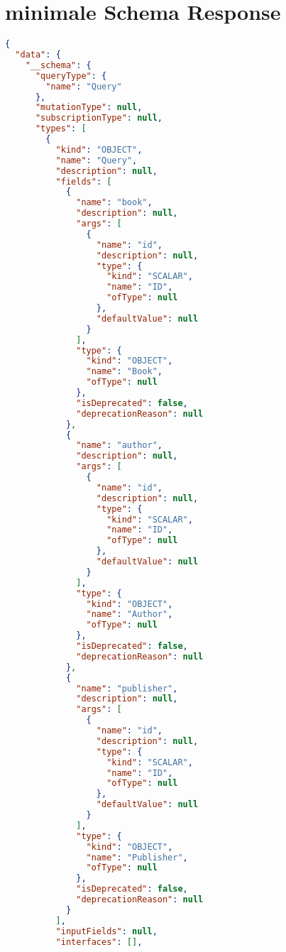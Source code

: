 \section*{minimale Schema Response}
\label{minimal-schema-response}
\begin{lstlisting}[language=json]
{
  "data": {
    "__schema": {
      "queryType": {
        "name": "Query"
      },
      "mutationType": null,
      "subscriptionType": null,
      "types": [
        {
          "kind": "OBJECT",
          "name": "Query",
          "description": null,
          "fields": [
            {
              "name": "book",
              "description": null,
              "args": [
                {
                  "name": "id",
                  "description": null,
                  "type": {
                    "kind": "SCALAR",
                    "name": "ID",
                    "ofType": null
                  },
                  "defaultValue": null
                }
              ],
              "type": {
                "kind": "OBJECT",
                "name": "Book",
                "ofType": null
              },
              "isDeprecated": false,
              "deprecationReason": null
            },
            {
              "name": "author",
              "description": null,
              "args": [
                {
                  "name": "id",
                  "description": null,
                  "type": {
                    "kind": "SCALAR",
                    "name": "ID",
                    "ofType": null
                  },
                  "defaultValue": null
                }
              ],
              "type": {
                "kind": "OBJECT",
                "name": "Author",
                "ofType": null
              },
              "isDeprecated": false,
              "deprecationReason": null
            },
            {
              "name": "publisher",
              "description": null,
              "args": [
                {
                  "name": "id",
                  "description": null,
                  "type": {
                    "kind": "SCALAR",
                    "name": "ID",
                    "ofType": null
                  },
                  "defaultValue": null
                }
              ],
              "type": {
                "kind": "OBJECT",
                "name": "Publisher",
                "ofType": null
              },
              "isDeprecated": false,
              "deprecationReason": null
            }
          ],
          "inputFields": null,
          "interfaces": [],

\end{lstlisting}
